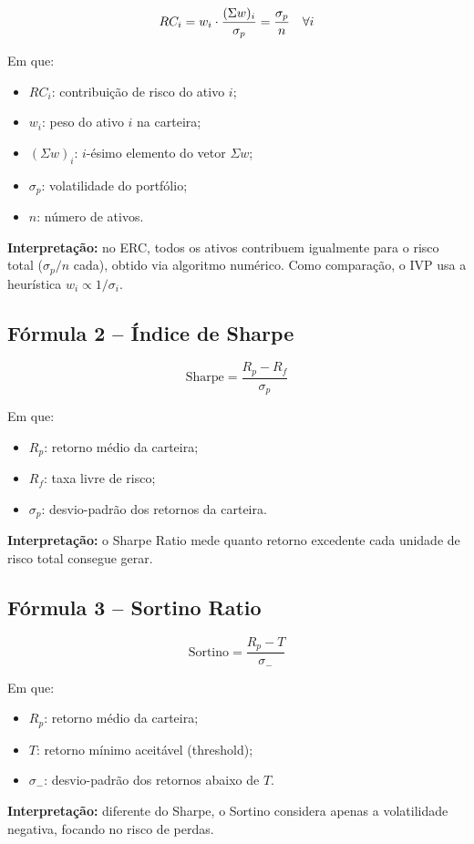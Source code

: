 \begin{equation}
\begin{equation}
RC_i = w_i \cdot \frac{(\Sigma w)_i}{\sigma_p} = \frac{\sigma_p}{n} \quad \forall i
\end{equation}

Em que:
\begin{itemize}
    \item $RC_i$: contribuição de risco do ativo $i$;
    \item $w_i$: peso do ativo $i$ na carteira;
    \item $(\Sigma w)_i$: $i$-ésimo elemento do vetor $\Sigma w$;
    \item $\sigma_p$: volatilidade do portfólio;
    \item $n$: número de ativos.
\end{itemize}

\textbf{Interpretação:} no ERC, todos os ativos contribuem igualmente para o risco total ($\sigma_p/n$ cada), obtido via algoritmo numérico. Como comparação, o IVP usa a heurística $w_i \propto 1/\sigma_i$.

\subsection{Fórmula 2 -- Índice de Sharpe}

\begin{equation}
\text{Sharpe} = \frac{R_p - R_f}{\sigma_p}
\end{equation}

Em que:
\begin{itemize}
    \item $R_p$: retorno médio da carteira;
    \item $R_f$: taxa livre de risco;
    \item $\sigma_p$: desvio-padrão dos retornos da carteira.
\end{itemize}

\textbf{Interpretação:} o Sharpe Ratio mede quanto retorno excedente cada unidade de risco total consegue gerar.

\subsection{Fórmula 3 -- Sortino Ratio}

\begin{equation}
\text{Sortino} = \frac{R_p - T}{\sigma_-}
\end{equation}

Em que:
\begin{itemize}
    \item $R_p$: retorno médio da carteira;
    \item $T$: retorno mínimo aceitável (threshold);
    \item $\sigma_-$: desvio-padrão dos retornos abaixo de $T$.
\end{itemize}

\textbf{Interpretação:} diferente do Sharpe, o Sortino considera apenas a volatilidade negativa, focando no risco de perdas.